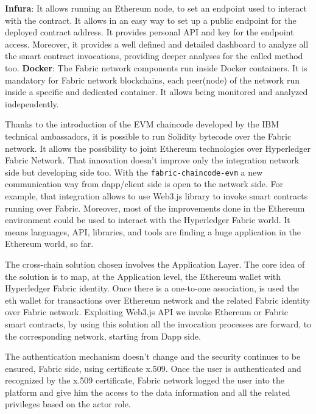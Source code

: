 \begin{outline}
    \1 \textbf{Infura}: It allows running an Ethereum node, to set an endpoint used to interact with the 
    contract. It allows in an easy way to set up a public endpoint for the deployed contract address. 
    It provides personal API and key for the endpoint access. Moreover, it provides a well defined and 
    detailed dashboard to analyze all the smart contract invocations, providing deeper analyses for the 
    called method too.  
    \1 \textbf{Docker}: The Fabric network components run inside Docker containers. It is mandatory
    for Fabric network blockchains, each peer(node) of the network run inside a specific and 
    dedicated container. It allows being monitored and analyzed independently. 
\end{outline}

Thanks to the introduction of the EVM chaincode developed by the IBM technical ambassadors,
it is possible to run Solidity bytecode over the Fabric network. It allows the possibility to joint 
Ethereum technologies over Hyperledger Fabric Network.
That innovation doesn't improve only the integration network side but developing side too. With the 
\texttt{fabric-chaincode-evm} a new communication way from dapp/client side is open to the network side.
For example, that integration allows to use Web3.js library to invoke smart contracts running over Fabric. 
Moreover, most of the improvements done in the Ethereum environment could be used to interact with the 
Hyperledger Fabric world. It means languages, API, libraries, and tools are finding a huge application 
in the Ethereum world, so far. 
\bigskip

The cross-chain solution chosen involves the Application Layer. The core idea of the solution is to map, at 
the Application level, the Ethereum wallet with Hyperledger Fabric identity. Once there is a one-to-one 
association, is used the eth wallet for transactions over Ethereum network and the related Fabric 
identity over Fabric network. Exploiting Web3.js API we invoke Ethereum or Fabric smart contracts, by using 
this solution all the invocation processes are forward, to the corresponding network, starting from Dapp 
side. 
\bigskip

The authentication mechanism doesn't change and the security continues to be ensured, Fabric side, using 
certificate x.509. Once the user is authenticated and recognized by the x.509 certificate, Fabric network 
logged the user into the platform and give him the access to the data information and all the related 
privileges based on the actor role.
\bigskip

